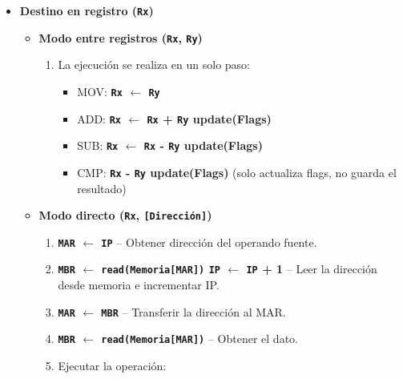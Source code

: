 \documentclass[12pt,oneside]{templates/unerthesis}
\providecommand{\tightlist}{%
  \setlength{\itemsep}{0pt}\setlength{\parskip}{0pt}}
\begin{document}
\begin{itemize}
\tightlist
\item
  \textbf{Destino en registro (\texttt{Rx})}

  \begin{itemize}
  \tightlist
  \item
    \textbf{Modo entre registros (\texttt{Rx}, \texttt{Ry})}

    \begin{enumerate}
    \def\labelenumi{\arabic{enumi}.}
    \setcounter{enumi}{3}
    \tightlist
    \item
      La ejecución se realiza en un solo paso:

      \begin{itemize}
      \tightlist
      \item
        MOV: \textbf{\texttt{Rx} \(\leftarrow\) \texttt{Ry}}
      \item
        ADD: \textbf{\texttt{Rx} \(\leftarrow\) \texttt{Rx} + \texttt{Ry} \textbar{} update(Flags)}
      \item
        SUB: \textbf{\texttt{Rx} \(\leftarrow\) \texttt{Rx} - \texttt{Ry} \textbar{} update(Flags)}
      \item
        CMP: \textbf{\texttt{Rx} - \texttt{Ry} \textbar{} update(Flags)} (solo actualiza flags, no guarda el resultado)
      \end{itemize}
    \end{enumerate}
  \item
    \textbf{Modo directo (\texttt{Rx}, \texttt{{[}Dirección{]}})}

    \begin{enumerate}
    \def\labelenumi{\arabic{enumi}.}
    \setcounter{enumi}{3}
    \tightlist
    \item
      \textbf{\texttt{MAR} \(\leftarrow\) \texttt{IP}} -- Obtener dirección del operando fuente.
    \item
      \textbf{\texttt{MBR} \(\leftarrow\) \texttt{read(Memoria{[}MAR{]})} \textbar{} \texttt{IP} \(\leftarrow\) \texttt{IP} + 1} -- Leer la dirección desde memoria e incrementar IP.
    \item
      \textbf{\texttt{MAR} \(\leftarrow\) \texttt{MBR}} -- Transferir la dirección al MAR.
    \item
      \textbf{\texttt{MBR} \(\leftarrow\) \texttt{read(Memoria{[}MAR{]})}} -- Obtener el dato.
    \item
      Ejecutar la operación:


\end{enumerate}
\end{itemize}
\end{itemize}
\end{document}
